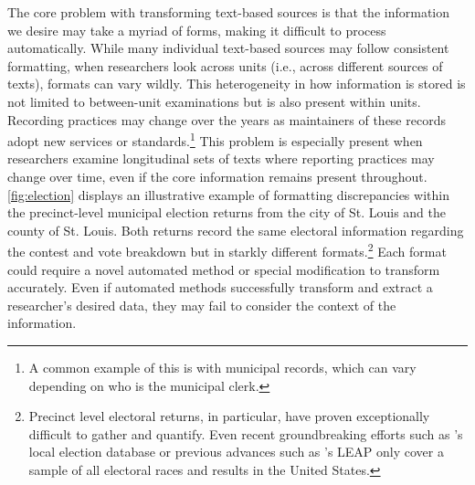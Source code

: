     The core problem with transforming text-based sources is that the information we desire may take a myriad of forms, making it difficult to process automatically. While many individual text-based sources may follow consistent formatting, when researchers look across units (i.e., across different sources of texts), formats can vary wildly. This heterogeneity in how information is stored is not limited to between-unit examinations but is also present within units. Recording practices may change over the years as maintainers of these records adopt new services or standards.\footnote{A common example of this is with municipal records, which can vary depending on who is the municipal clerk.} This problem is especially present when researchers examine longitudinal sets of texts where reporting practices may change over time, even if the core information remains present throughout. \autoref{fig:election} displays an illustrative example of formatting discrepancies within the precinct-level municipal election returns from the city of St. Louis and the county of St. Louis. Both returns record the same electoral information regarding the contest and vote breakdown but in starkly different formats.\footnote{Precinct level electoral returns, in particular, have proven exceptionally difficult to gather and quantify. Even recent groundbreaking efforts such as \citet{debenedictis-kessnerAmericanLocalGovernment2023}'s local election database or previous advances such as \citet{marschallStudyLocalElections2011}'s LEAP only cover a sample of all electoral races and results in the United States.} Each format could require a novel automated method or special modification to transform accurately. Even if automated methods successfully transform and extract a researcher's desired data, they may fail to consider the context of the information.



